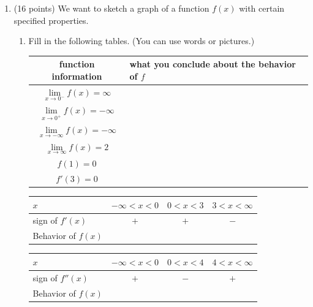 \documentclass[11pt]{article}
\begin{document}
\begin{enumerate}
\newpage

\item (16 points) We want to sketch a graph of a function $f(x)$ with certain specified properties.

\begin{enumerate}
\item Fill in the following tables. (You can use words or pictures.)

\renewcommand{\arraystretch}{1.8}
\begin{tabular}{| c | l |} \hline
function information & \quad \hspace{1.5cm} what you conclude about the behavior of $f$\hspace{1.5cm} \quad\\ \hline \hline
 $\lim\limits_{x \to 0^-} f(x) = \infty$ & \\ 
 $\lim\limits_{x \to 0^+} f(x) = -\infty$ &\\ \hline
 $\lim\limits_{x \to - \infty} f(x) = -\infty$  & \\ \hline
 $\lim\limits_{x \to  \infty} f(x) = 2$  & \\ \hline
 $f(1) =0$ & \\ \hline
 $f'(3) =  0$ & \\ \hline
\end{tabular}

\bigskip

\begin{small}
\begin{tabular}{| l || c |  c | c | }
\hline
 $x$  &\quad $-\infty< x<0$ \quad \quad &\quad  $0 < x <3$ \quad \quad & $3 < x < \infty$  \\ \hline
 sign of $f'(x)$ & $+$  & $+$  & $-$     \\ \hline
Behavior of $f(x)$& &&\\ \hline
  \end{tabular}
  \end{small}
  
  \begin{small}
\begin{tabular}{| l || c | c | c | }\hline
 $x$  &\quad $-\infty< x<0$ \quad \quad& \quad \hspace{.1in}\quad$0< x < 4$ \quad  \hspace{.1in} \quad& $4 < x < \infty $ \\ \hline
 sign of $f''(x)$ & $+$ & $-$ & $+$  \\ \hline
Behavior of $f(x)$& &&\\\hline
  \end{tabular}
  \end{small}


\end{enumerate}
\end{enumerate}
\end{document}
